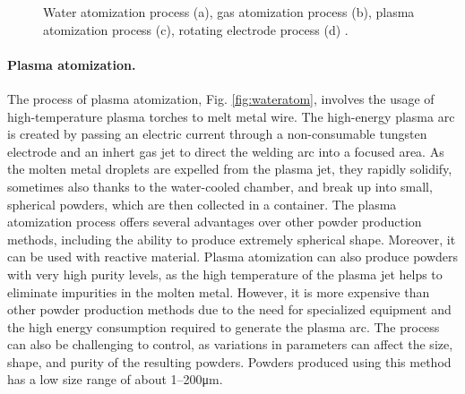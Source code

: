\begin{figure}
{    }
    \qquad
    \caption[Atomization processes]{Water atomization process (a), gas atomization process (b), plasma atomization process (c), rotating electrode process (d) \cite{material_technology_innovations_co_rotating_2020, material_technology_innovations_co_water_2020, material_technology_innovations_co_gas_2020, inovar_communications_ltd_metal_2020}.}
    \label{fig:atom}
\end{figure}
\paragraph{Plasma atomization.} The process of plasma atomization, Fig. \ref{fig:wateratom}, involves the usage of high-temperature plasma torches to melt metal wire. The high-energy plasma arc is created by passing an electric current through a non-consumable tungsten electrode and an inhert gas jet to direct the welding arc into a focused area. As the molten metal droplets are expelled from the plasma jet, they rapidly solidify, sometimes also thanks to the water-cooled chamber, and break up into small, spherical powders, which are then collected in a container. The plasma atomization process offers several advantages over other powder production methods, including the ability to produce extremely spherical shape. Moreover, it can be used with reactive material. Plasma atomization can also produce powders with very high purity levels, as the high temperature of the plasma jet helps to eliminate impurities in the molten metal. However, it is more expensive than other powder production methods due to the need for specialized equipment and the high energy consumption required to generate the plasma arc. The process can also be challenging to control, as variations in parameters can affect the size, shape, and purity of the resulting powders. Powders produced using this method has a low size range of about \numrange[range-phrase = --]{1}{200}\unit{\micro\metre}.
